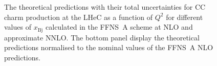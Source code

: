 \documentclass[pdftex,twocolumn,epjc3]{svjour3}          %
\newcommand{\xbj}{\ensuremath{x_{\text{Bj}}}\xspace}
\newcommand{\fonll} {{FONLL-B}\xspace}
\newcommand{\ffns} {{FFNS~A}\xspace}
\newcommand{\ffnsb} {{FFNS~B}\xspace}
\newcommand{\ffthreea} {{\hbox{HERAPDF2.0} FF3A}\xspace}
\newcommand{\ffthreeb} {{\hbox{HERAPDF2.0} FF3B}\xspace}
\begin{document}
%
%

\begin{figure}
    \centering
    \caption{The theoretical predictions with their total
      uncertainties for CC charm production at the LHeC as a function
      of $Q^2$ for different values of \xbj calculated in the \ffns
      scheme at NLO and approximate NNLO. The bottom panel display the
      theoretical predictions normalised to the nominal values of the
      \ffns NLO predictions.}
    \label{fig:thpred-q2-nnlo}
\end{figure}
\end{document}
